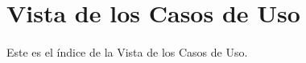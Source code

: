 \newpage
\section{Vista de los Casos de Uso}
\paragraph{}
Este es el índice de la Vista de los Casos de Uso.
